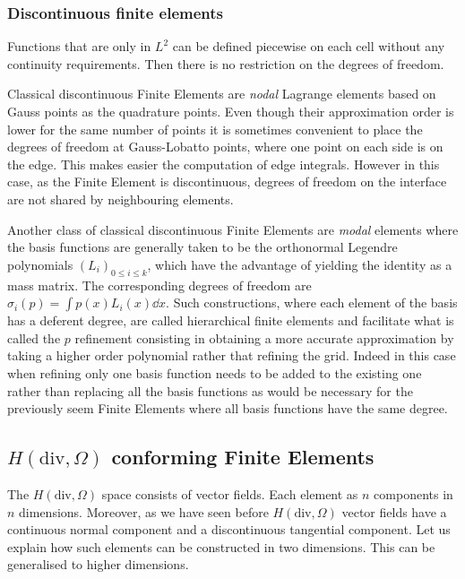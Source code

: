 \subsubsection{Discontinuous finite elements}


Functions that are only in $L^2$ can be defined piecewise on each cell without any continuity requirements. 
Then there is no restriction on the degrees of freedom. 

Classical discontinuous Finite Elements are  \emph{nodal} Lagrange elements based on Gauss 
points as the quadrature points. Even though their approximation order is lower for the same number of points it is sometimes convenient to place the degrees of freedom at Gauss-Lobatto points, where one point on each side is on the edge. This makes easier the computation of edge integrals. However in this case, as the Finite Element is discontinuous, degrees of freedom on the interface are not shared by neighbouring elements. 

Another class of classical discontinuous Finite Elements are \emph{modal} elements where the basis functions are generally taken to be the orthonormal Legendre polynomials $(L_i)_{0\leq i \leq k}$, which have the advantage of  yielding the identity as a mass matrix. The corresponding degrees of freedom are
$\sigma_i(p) = \int p(x) L_i(x) \dd x.$ 
Such constructions, where each element of the basis has a deferent degree, are called hierarchical finite elements and facilitate what is called the $p$ refinement consisting in obtaining a more accurate approximation by taking a higher order polynomial rather that refining the grid. Indeed in this case when refining only one basis function needs to be added to the existing one rather than replacing all the basis functions as would be necessary for the previously seem Finite Elements where all basis functions have the same degree. 


\subsection{ $H(\textrm{div}, \Omega)$ conforming Finite Elements}

The $H(\textrm{div}, \Omega)$ space consists of vector fields. Each element as $n$ components in  $n$ dimensions. Moreover, as we have seen before $H(\textrm{div}, \Omega)$ vector fields have a continuous normal component and a discontinuous tangential component. Let us explain how such elements can be constructed in two dimensions. This can be generalised to higher dimensions. 

